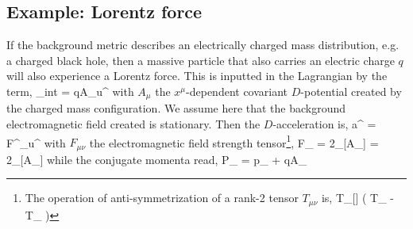\subsection{Example: Lorentz force}
If the background metric describes an electrically charged mass distribution, e.g. a charged black hole, then a massive particle that also carries an electric charge $q$ will also experience a Lorentz force. This is inputted in the Lagrangian by the term,
\be
	_{int} = qA_{\mu}u^{\mu}
\ee
with $A_{\mu}$ the $x^{\mu}$-dependent covariant $D$-potential created by the charged mass configuration. We assume here that the background electromagnetic field created is stationary. Then the $D$-acceleration is,
\be
	a^{\rho} = F^{\rho}_{\;\;\sigma}u^{\sigma}
\ee
with $F_{\mu\nu}$ the electromagnetic field strength tensor\footnote{The operation of anti-symmetrization of a rank-2 tensor $T_{\mu\nu}$ is,
\be
	T_{[\mu\nu]} \equiv {}\left( T_{\mu\nu} - T_{\nu\mu} \right)
\ee},
\be
	F_{\mu\nu} = 2\nabla_{[\mu}A_{\nu]} = 2\partial_{[\mu}A_{\nu]}
\ee
while the conjugate momenta read,
\be
	P_{\mu} = p_{\mu} + qA_{\mu}
\ee